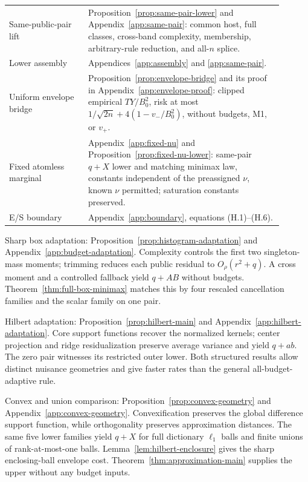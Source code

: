 \begin{center}
\begin{tabular}{L{0.26\linewidth}L{0.64\linewidth}}
Same-public-pair lift & Proposition~\ref{prop:same-pair-lower} and
Appendix~\ref{app:same-pair}: common host, full classes, cross-band
complexity, membership, arbitrary-rule reduction, and all-\(n\) splice. \\
Lower assembly & Appendices~\ref{app:assembly} and \ref{app:same-pair}. \\
Uniform envelope bridge & Proposition~\ref{prop:envelope-bridge} and its
proof in Appendix~\ref{app:envelope-proof}: clipped empirical \(TY/B_0^2\), risk at most
\(1/\sqrt{2n}+4(1-v_-/B_0^2)\), without budgets, M1, or \(v_+\). \\
Fixed atomless marginal & Appendix~\ref{app:fixed-nu} and
Proposition~\ref{prop:fixed-nu-lower}: same-pair \(q+X\) lower and matching
minimax law, constants independent of the preassigned \(\nu\), known
\(\nu\) permitted; saturation constants preserved. \\
E/S boundary & Appendix~\ref{app:boundary}, equations (H.1)--(H.6). \\
\bottomrule
\end{tabular}
\end{center}

Sharp box adaptation: Proposition~\ref{prop:histogram-adaptation} and
Appendix~\ref{app:budget-adaptation}. Complexity controls the first two
singleton-mass moments; trimming reduces each public residual to
\(O_\rho(r^2+q)\). A cross moment and a controlled fallback yield \(q+AB\)
without budgets. Theorem~\ref{thm:full-box-minimax} matches this by four
rescaled cancellation families and the scalar family on one pair.

Hilbert adaptation: Proposition~\ref{prop:hilbert-main} and
Appendix~\ref{app:hilbert-adaptation}. Core support functions recover the
normalized kernels; center projection and ridge residualization preserve
average variance and yield \(q+ab\). The zero pair witnesses its restricted
outer lower. Both structured results allow distinct nuisance geometries
and give faster rates than the general all-budget-adaptive rule.

Convex and union comparison: Proposition~\ref{prop:convex-geometry} and
Appendix~\ref{app:convex-geometry}. Convexification preserves the global
difference support function, while orthogonality preserves approximation
distances. The same five lower families yield \(q+X\) for full dictionary
\(\ell_1\) balls and finite unions of rank-at-most-one balls.
Lemma~\ref{lem:hilbert-enclosure} gives the sharp enclosing-ball envelope
cost. Theorem~\ref{thm:approximation-main} supplies the upper
without any budget inputs.

